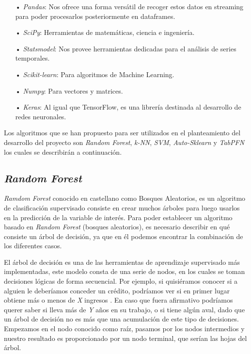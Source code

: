 \begin{itemize}
\item[•] \textit{Pandas}: Nos ofrece una forma versátil de recoger estos datos en streaming para poder procesarlos posteriormente en dataframes.
\item[•] \textit{SciPy}: Herramientas de matemáticas, ciencia e ingeniería. 
\item[•] \textit{Statsmodel}: Nos provee herramientas dedicadas para el análisis de series temporales.
\item[•] \textit{Scikit-learn}: Para algoritmos de Machine Learning. 
\item[•] \textit{Numpy}: Para vectores y matrices.
\item[•] \textit{Keras}: Al igual que TensorFlow, es una librería destinada al desarrollo de redes neuronales.
\end{itemize}

Los algoritmos que se han propuesto para ser utilizados en el planteamiento del desarrollo del proyecto son \textit{Random Forest}, \textit{k-NN}, \textit{SVM}, \textit{Auto-Sklearn} y \textit{TabPFN} los cuales se describirán a continuación.

\subsection{\textit{Random Forest}}
\textit{Ramdom Forest} conocido en castellano como Bosques Aleatorios, es un algoritmo de clasificación supervisado consiste en crear muchos árboles para luego usarlos en la predicción de la variable de interés. Para poder establecer un algoritmo basado en \textit{Random Forest} (bosques aleatorios), es necesario describir en qué consiste un árbol de decisión, ya que en él podemos encontrar la combinación de los diferentes casos.

El árbol de decisión es una de las herramientas de aprendizaje supervisado más implementadas, este modelo consta de una serie de nodos, en los cuales se toman decisiones lógicas de forma secuencial. Por ejemplo, si quisiéramos conocer si a alguien le deberíamos conceder un crédito, podríamos ver si en primer lugar obtiene más o menos de \textit{X} ingresos \cite{AndresAlbelda}. En caso que fuera afirmativo podríamos querer saber si lleva más de \textit{Y} años en su trabajo, o si tiene algún aval, dado que un árbol de decisión no es más que una acumulación de este tipo de decisiones. Empezamos en el nodo conocido como raíz, pasamos por los nodos intermedios y nuestro resultado es proporcionado por un nodo terminal, que serían las hojas del árbol.


